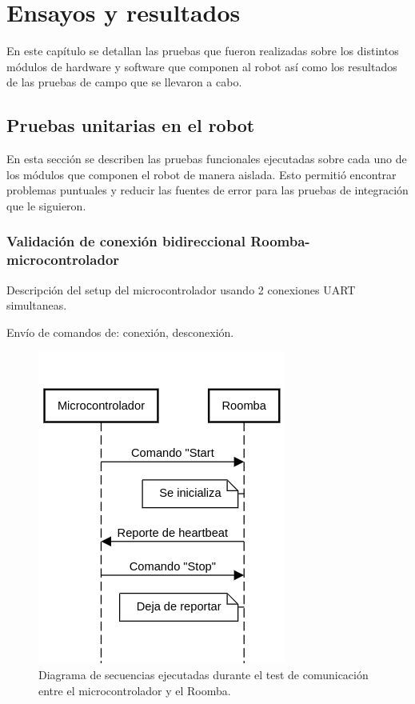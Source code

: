
\chapter{Ensayos y resultados} %

\label{Capitulo4}

En este capítulo se detallan las pruebas que fueron realizadas sobre los distintos módulos de hardware y software que componen al robot así como los resultados de las pruebas de campo que se llevaron a cabo.

\section{Pruebas unitarias en el robot}

En esta sección se describen las pruebas funcionales ejecutadas sobre cada uno de los módulos que componen el robot de manera aislada. Esto permitió encontrar problemas puntuales y reducir las fuentes de error para las pruebas de integración que le siguieron.

\subsection{Validación de conexión bidireccional Roomba-microcontrolador}

Descripción del setup del microcontrolador usando 2 conexiones UART simultaneas.

Envío de comandos de: conexión, desconexión.

\begin{figure}[ht]
    \centering
    \includegraphics[scale=0.6]{./Figures/comm_test2.png}
    \caption{Diagrama de secuencias ejecutadas durante el test de comunicación entre el microcontrolador y el Roomba.}
    \label{fig:rviz}
\end{figure}

